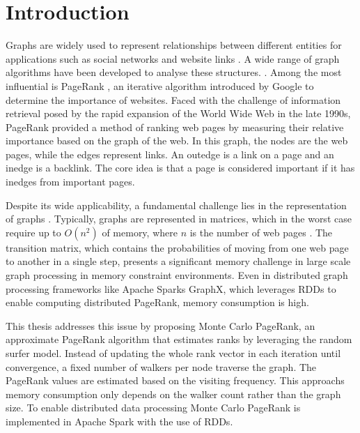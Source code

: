 \section{Introduction}


Graphs are widely used to represent relationships between different entities for applications such as social networks and website links \cite{zhang_distributed_2021}. 
A wide range of graph algorithms have been developed to analyse these structures. \cite{malewicz_pregel_2010}\cite{low_distributed_2012}\cite{koch_empirical_2016}. Among the most influential is PageRank \cite{page_pagerank_1999}, an iterative algorithm introduced by Google to determine the importance of websites. Faced with the challenge of information retrieval posed by the rapid expansion of the World Wide Web in the late 1990s, PageRank provided a method of ranking web pages by measuring their relative importance based on the graph of the web. In this graph, the nodes are the web pages, while the edges represent links. An outedge is a link on a page and an inedge is a backlink. The core idea is that a page is considered important if it has inedges from important pages.\par 
Despite its wide applicability, a fundamental challenge lies in the representation of graphs \cite{liu_fast_2015}. Typically, graphs are represented in matrices, which in the worst case require up to $O(n^2)$ of memory, where $n$ is the number of web pages \cite{wu_efficient_2024}. The transition matrix, which contains the probabilities of moving from one web page to another in a single step, presents a significant memory challenge in large scale graph processing in memory constraint environments. Even in distributed graph processing frameworks like Apache Sparks GraphX, which leverages RDDs to enable computing distributed PageRank, memory consumption is high. \par

This thesis addresses this issue by proposing Monte Carlo PageRank, an approximate PageRank algorithm that estimates ranks by leveraging the random surfer model. Instead of updating the whole rank vector in each iteration until convergence, a fixed number of walkers per node traverse the graph. The PageRank values are estimated based on the visiting frequency. This approachs memory consumption only depends on the walker count rather than the graph size. To enable distributed data processing Monte Carlo PageRank is implemented in Apache Spark with the use of RDDs.\par

